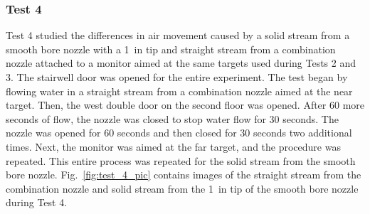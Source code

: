 \documentclass[12pt,oneside]{book}
\begin{document}
\subsubsection{Test 4}
Test 4 studied the differences in air movement caused by a solid stream from a smooth bore nozzle with a 1~in tip and straight stream from a combination nozzle attached to a monitor aimed at the same targets used during Tests 2 and 3. The stairwell door was opened for the entire experiment. The test began by flowing water in a straight stream from a combination nozzle aimed at the near target. Then, the west double door on the second floor was opened. After 60 more seconds of flow, the nozzle was closed to stop water flow for 30 seconds. The nozzle was opened for 60 seconds and then closed for 30 seconds two additional times. Next, the monitor was aimed at the far target, and the procedure was repeated. This entire process was repeated for the solid stream from the smooth bore nozzle. Fig.~\ref{fig:test_4_pic} contains images of the straight stream from the combination nozzle and solid stream from the 1~in tip of the smooth bore nozzle during Test 4.
\end{document}
